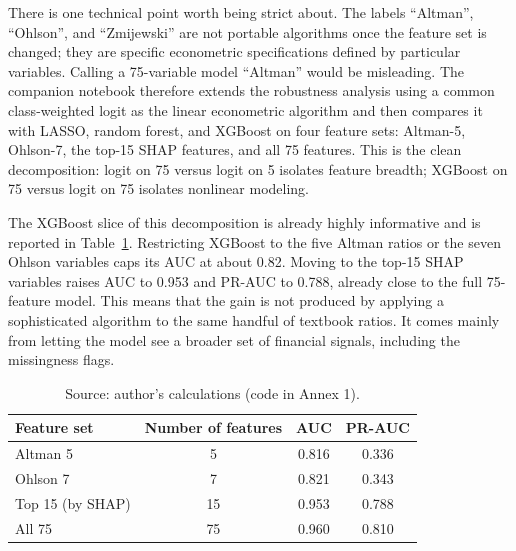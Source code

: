 \documentclass[12pt,a4paper]{article}
\begin{document}
There is one technical point worth being strict about. The labels
``Altman'', ``Ohlson'', and ``Zmijewski'' are not portable algorithms once the
feature set is changed; they are specific econometric specifications defined
by particular variables. Calling a 75-variable model ``Altman'' would be
misleading. The companion notebook therefore extends the robustness analysis
using a common class-weighted logit as the linear econometric algorithm and
then compares it with LASSO, random forest, and XGBoost on four feature sets:
Altman-5, Ohlson-7, the top-15 SHAP features, and all 75 features. This is the
clean decomposition: logit on 75 versus logit on 5 isolates feature breadth;
XGBoost on 75 versus logit on 75 isolates nonlinear modeling.

The XGBoost slice of this decomposition is already highly informative and is
reported in Table~\ref{tab:robust-features}. Restricting XGBoost to the five
Altman ratios or the seven Ohlson variables caps its AUC at about 0.82. Moving
to the top-15 SHAP variables raises AUC to 0.953 and PR-AUC to 0.788, already
close to the full 75-feature model. This means that the gain is not produced
by applying a sophisticated algorithm to the same handful of textbook ratios.
It comes mainly from letting the model see a broader set of financial signals,
including the missingness flags.

\begin{table}[H]
\centering
\caption{XGBoost performance by feature-set size at H1. The expanded notebook
runs the same feature-set grid for the transferable model classes (logit,
LASSO, random forest, XGBoost) and exports the full AUC and PR-AUC matrices.
The top-15 set is the SHAP importance ranking from Section~\ref{sec:shap}.}
\label{tab:robust-features}
\small
\begin{tabular}{lccc}
\toprule
Feature set & Number of features & AUC & PR-AUC \\
\midrule
Altman 5         &  5 & 0.816 & 0.336 \\
Ohlson 7         &  7 & 0.821 & 0.343 \\
Top 15 (by SHAP) & 15 & 0.953 & 0.788 \\
All 75           & 75 & 0.960 & 0.810 \\
\bottomrule
\end{tabular}
\caption*{\footnotesize Source: author's calculations (code in Annex 1).}
\end{table}
\end{document}
